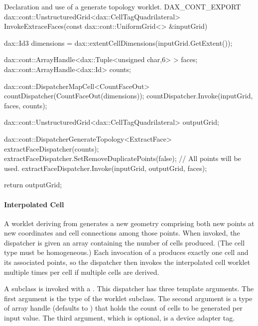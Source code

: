 \begin{daxexample}{Declaration and use of a generate topology worklet.}
DAX_CONT_EXPORT
dax::cont::UnstructuredGrid<dax::CellTagQuadrilateral>
InvokeExtraceFaces(const dax::cont::UniformGrid<> &inputGrid)
{
  dax::Id3 dimensions = dax::extentCellDimensions(inputGrid.GetExtent());

  dax::cont::ArrayHandle<dax::Tuple<unsigned char,6> > faces;
  dax::cont::ArrayHandle<dax::Id> counts;

  dax::cont::DispatcherMapCell<CountFaceOut> countDispatcher(CountFaceOut(dimensions));
  countDispatcher.Invoke(inputGrid, faces, counts);

  dax::cont::UnstructuredGrid<dax::CellTagQuadrilateral> outputGrid;

  dax::cont::DispatcherGenerateTopology<ExtractFace> extractFaceDispatcher(counts);
  extractFaceDispatcher.SetRemoveDuplicatePoints(false); // All points will be used.
  extractFaceDispatcher.Invoke(inputGrid, outputGrid, faces);

  return outputGrid;
}
\end{daxexample}


\paragraph{Interpolated Cell}


A worklet deriving from  generates a new
geometry comprising both new points at new coordinates and cell connections
among those points. When invoked, the dispatcher is given an array
containing the number of cells produced. (The cell type must be
homogeneous.) Each invocation of a 
produces exactly one cell and its associated points, so the dispatcher then
invokes the interpolated cell worklet multiple times per cell if multiple
cells are derived.

A  subclass is invoked with a
. This dispatcher has three template
arguments. The first argument is the type of the worklet subclass. The
second argument is a type of array handle (defaults to
\textcode{<}\textcode{>}) that holds the count
of cells to be generated per input value. The third argument, which is
optional, is a device adapter tag.

